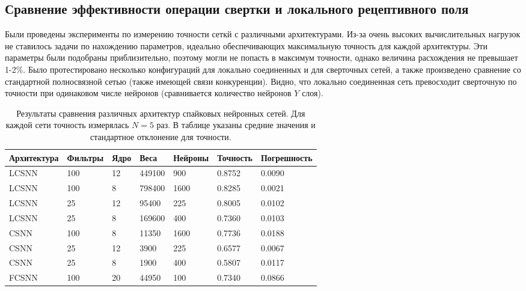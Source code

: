 \documentclass[a4paper]{article}
\begin{document}
\subsection{Сравнение эффективности операции свертки и локального рецептивного поля}
Были проведены эксперименты по измерению точности сеткй с различными архитектурами. Из-за очень высоких вычислительных нагрузок не ставилось задачи по нахождению параметров, идеально обеспечивающих максимальную точность для каждой архитектуры. Эти параметры были подобраны приблизительно, поэтому могли не попасть в максимум точности, однако величина расхождения не превышает 1-2\%. Было протестировано несколько конфигураций для локально соединенных и для сверточных сетей, а также произведено сравнение со стандартной полносвязной сетью (также имеющей связи конкуренции). Видно, что локально соединенная сеть превосходит сверточную по точности при одинаковом числе нейронов (сравнивается количество нейронов $Y$ слоя). 

\begin{table}[H]
 \caption{Результаты сравнения различных архитектур спайковых нейронных сетей. Для каждой сети точность измерялась $N=5$ раз. В таблице указаны средние значения и стандартное отклонение для точности.}
\begin{center}
\begin{tabular}{|l|l|l|l|l|l|l|}
\hline
Архитектура & Фильтры & Ядро & Веса & Нейроны & Точность & Погрешность\\
\hline
{LCSNN} & {100} & {12} & {449100} & {900} & {0.8752} & {0.0090}\\
\hline
{LCSNN} & {100} & {8} & {798400} & {1600} & {0.8285} & {0.0021}\\
\hline
{LCSNN} & {25} & {12} & {95400} & {225} & {0.8005} & {0.0102}\\
\hline
{LCSNN} & {25} & {8} & {169600} & {400} & {0.7360} & {0.0103}\\
\hline
{CSNN} & {100} & {8} & {11350} & {1600} & {0.7736} & {0.0188}\\
\hline
{CSNN} & {25} & {12} & {3900} & {225} & {0.6577} & {0.0067}\\
\hline
{CSNN} & {25} & {8} & {1900} & {400} & {0.5807} & {0.0117}\\
\hline
{FCSNN} & {100} & {20} & {44950} & {100} & {0.7340} & {0.0866}\\
\hline
\end{tabular}
\end{center}
\end{table}
\end{document}
